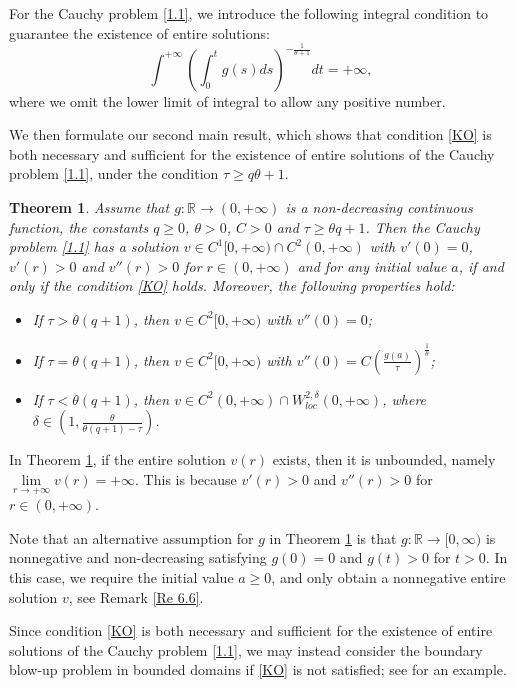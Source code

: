 \documentclass[a4paper,11pt]{amsart}
\theoremstyle{plain}
\newtheorem{Theorem}{Theorem}[section]
\theoremstyle{remark}
\numberwithin{equation}{section}
\numberwithin{figure}{section}
\numberwithin{remark}{section}
\begin{document}
\begin{sloppypar}
For the Cauchy problem \eqref{1.1}, we introduce the following integral condition to guarantee the  existence of entire solutions:
	\begin{equation}\label{KO}
	\int^{+\infty} \left ( \int_0^t g(s)ds \right )^{-\frac{1}{\theta+1}} dt = + \infty,
	\end{equation}
where we omit the lower limit of integral to allow any positive number. 

	
We then formulate our second main result, which shows that condition \eqref{KO} is both necessary and sufficient for the existence of entire solutions of the Cauchy problem \eqref{1.1}, under the condition $\tau \ge q\theta+1$.	
\begin{Theorem}\label{Th 1.2}
Assume that $g: \mathbb{R} \to (0,+\infty)$ is a non-decreasing continuous function, the constants $q\ge 0$, $\theta> 0$, $C>0$ and $\tau \ge \theta q+1$. Then the Cauchy problem \eqref{1.1} has a solution $v \in C^1[0, +\infty)\cap C^2(0, +\infty)$ with $v'(0)=0$, $v'(r)>0$ and $v''(r)>0$ for $r\in (0, +\infty)$ and for any initial value $a$, if and only if the condition \eqref{KO} holds. Moreover, the following properties hold:
\begin{itemize}
\item[(i).] If $\tau> \theta (q+1)$, then $v\in C^2[0, +\infty)$ with $v''(0)=0$; 

\item[(ii).] If $\tau= \theta (q+1)$, then $v\in C^2[0, +\infty)$ with $v''(0)=C(\frac{g(a)}{\tau})^{\frac{1}{\theta}}$; 

\item[(iii).] If $\tau < \theta (q+1)$, then $v \in C^2(0, +\infty) \cap W_{loc}^{2, \delta}(0, +\infty)$, where $\delta \in (1, \frac{\theta}{\theta (q+1)-\tau})$.
\end{itemize}
\end{Theorem}

In Theorem \ref{Th 1.2}, if the entire solution $v(r)$ exists, then it is unbounded, namely $\lim\limits_{r\to +\infty} v(r)= +\infty$.
This is because $v'(r)>0$ and $v''(r)>0$ for $r\in (0, +\infty)$.

Note that an alternative assumption for $g$ in Theorem \ref{Th 1.2} is that $g: \mathbb{R} \to [0, \infty)$ is nonnegative and non-decreasing satisfying $g(0)=0$ and $g(t)>0$ for $t>0$. In this case, we require the initial value $a\ge 0$, and only obtain a nonnegative entire solution $v$, see Remark \ref{Re 6.6}. 

Since condition \eqref{KO} is both necessary and sufficient for the existence of entire solutions of the Cauchy problem \eqref{1.1}, we may instead consider the boundary blow-up problem in bounded domains if \eqref{KO} is not satisfied; see \cite{JDJ2025} for an example.


\end{sloppypar}
\end{document}
